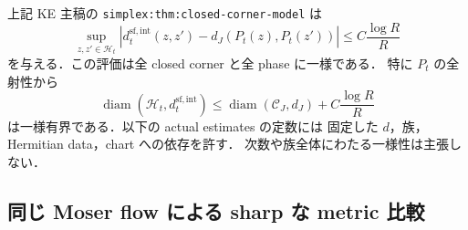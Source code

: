 上記 KE 主稿の \texttt{simplex:thm:closed-corner-model} は
\begin{equation}\label{ke:eq:closed-corner-model-input}
 \sup_{z,z'\in\mathcal H_t}
 \left|d_t^{\mathrm{sf,int}}(z,z')
       -d_J(P_t(z),P_t(z'))\right|
 \le C\frac{\log R}{R}
\end{equation}
を与える．この評価は全 closed corner と全 phase に一様である．
特に $P_t$ の全射性から
\begin{equation}\label{ke:eq:closed-model-diameter}
 \operatorname{diam}(\mathcal H_t,d_t^{\mathrm{sf,int}})
 \le\operatorname{diam}(\mathcal C_J,d_J)+C\frac{\log R}{R}
\end{equation}
は一様有界である．以下の actual estimates の定数には
固定した $d$，族，Hermitian data，chart への依存を許す．
次数や族全体にわたる一様性は主張しない．

\subsection{同じ Moser flow による sharp な metric 比較}

